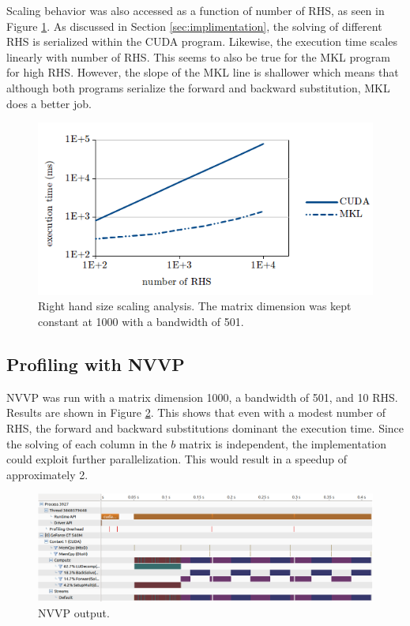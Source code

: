 \documentclass[12pt]{article}
\begin{document}
Scaling behavior was also accessed as a function of number of RHS, as seen in
Figure \ref{rhs}. As discussed in Section \ref{sec:implimentation}, the
solving of different RHS is serialized within the CUDA program.
Likewise, the execution time scales linearly with number of RHS. This seems to
also be true for the MKL program for high RHS. However, the slope of the MKL
line is shallower which means that although both programs serialize the forward
and backward substitution, MKL does a better job.

\begin{figure}[H]
\caption{Right hand size scaling analysis. The matrix dimension was kept constant at 1000 with a bandwidth of 501.}
\label{rhs}
\centerline{\includegraphics[width=12cm]{rhs.png}}
\end{figure}


\subsection{Profiling with NVVP}

NVVP was run with a matrix dimension 1000, a bandwidth of 501, and 10 RHS.
 Results are shown in Figure \ref{nvvp}. This shows that even with a
modest number of RHS, the forward and backward substitutions
dominant the execution time. Since the solving of each column in the $b$ matrix is
independent, the implementation could exploit further
parallelization. This would result in a speedup of approximately 2.

\begin{figure}[H]
\caption{NVVP output.}
\label{nvvp}
\centerline{\includegraphics[width=12cm]{nvvp.png}}
\end{figure}
\end{document}
